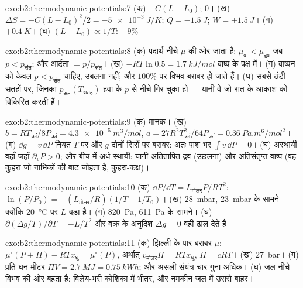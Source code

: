 \begin{solution}{exo:b2:thermodynamic-potentials:7}
(क) $-C(L - L_0)$; $0$। (ख) $\Delta S = -C(L - L_0)^2/2 = \qty{-5e-3}{J/K}$; $Q =
\qty{-1.5}{J}$; $W = +\qty{1.5}{J}$। (ग) $+\qty{0.4}{K}$। (घ) $(L - L_0) \propto
1/T$: $-9\%$।
\end{solution}

\begin{solution}{exo:b2:thermodynamic-potentials:8}
(क) पदार्थ नीचे $\mu$ की ओर जाता है: $\mu_{\text{वा}} < \mu_{\text{द्रव}}$ जब $p <
p_{\text{संत}}$; और आर्द्रता $= p/p_{\text{संत}}$। (ख) $-RT\ln 0.5 = \qty{1.7}{kJ/mol}$
वाष्प के पक्ष में। (ग) वाष्पन को केवल $p < p_{\text{संत}}$ चाहिए,
उबलना नहीं; और $100\%$ पर विभव बराबर हो जाते हैं। (घ) सबसे ठंडी
सतहों पर, जिनका $p_{\text{संत}}(T_{\text{सतह}})$ हवा के $p$ से नीचे गिर चुका हो
--- यानी वे जो रात के आकाश को विकिरित करती हैं।
\end{solution}

\begin{solution}{exo:b2:thermodynamic-potentials:9}
(क) मानक। (ख) $b = RT_{\text{क्रां}}/8P_{\text{क्रां}} = \qty{4.3e-5}{m^3/mol}$, $a =
27R^2T_{\text{क्रां}}^2/64P_{\text{क्रां}} = \qty{0.36}{Pa.m^6/mol^2}$। (ग) $\dd g = v\,\dd P$ नियत $T$ पर
और $g$ दोनों सिरों पर बराबर: अतः पाश भर $\int v\,\dd P = 0$। (घ) अस्थायी वहाँ जहाँ
$\partial_vP > 0$; और बीच में अर्ध-स्थायी: यानी
अतितापित द्रव (उछलना) और अतिसंतृप्त वाष्प (वह कुहरा जो
नाभिकों की बाट जोहता है, कुहरा-कक्ष)।
\end{solution}

\begin{solution}{exo:b2:thermodynamic-potentials:10}
(क) $\dd P/\dd T = L_{\text{मोलर}}P/RT^2$: $\ln(P/P_0) = -(L_{\text{मोलर}}/R)(1/T - 1/T_0)$।
(ख) \qty{28}{mbar}, \qty{23}{mbar} के सामने --- क्योंकि \qty{20}{\celsius} पर $L$ बड़ा है।
(ग) \qty{820}{Pa}, \qty{611}{Pa} के सामने। (घ) $\partial(\Delta g/T)/\partial T = -L/T^2$
और वक्र के अनुदिश $\Delta g = 0$ वही ढाल देते हैं।
\end{solution}

\begin{solution}{exo:b2:thermodynamic-potentials:11}
(क) झिल्ली के पार बराबर $\mu$: $\mu^\circ(P + \Pi) - RTx_{\text{घु}} =
\mu^\circ(P)$, अर्थात् $v_{\text{मोलर}}\Pi = RTx_{\text{घु}}$, $\Pi = cRT$। (ख) \qty{27}{bar}।
(ग) प्रति घन मीटर $\Pi V = \qty{2.7}{MJ} = \qty{0.75}{kWh}$; और असली संयंत्र
चार गुना अधिक। (घ) जल नीचे विभव की ओर बहता है: विलेय-भरी कोशिका में
भीतर, और नमकीन जल में उससे बाहर।
\end{solution}

